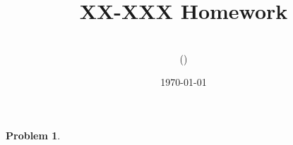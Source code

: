 \documentclass[11pt]{article}
\title{XX-XXX Homework \hwnumber} %
\author{\myname\\(\myandrewid)}
\date{\today} %
\newtheorem{theorem}{Problem}
\newcommand{\problem}{\newpage\begin{theorem}\end{theorem}}
\begin{document}
\maketitle

\problem
\end{document}
